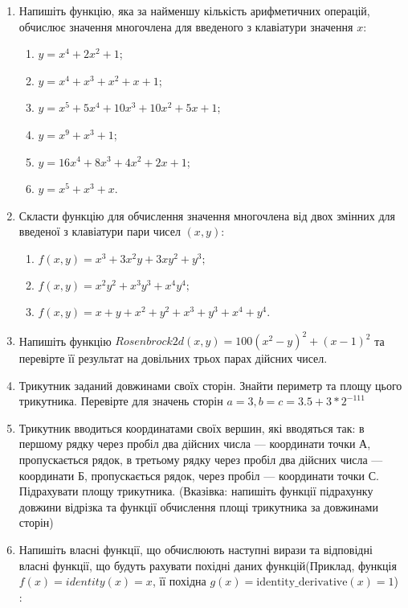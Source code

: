 \documentclass[]{article}
\makeatletter
\newcommand{\xslalph}[1]{\expandafter\@xslalph\csname c@#1\endcsname}
\newcommand{\@xslalph}[1]{%
    \ifcase#1\or а\or б\or в\or г\or д\or e\or є\or ж\or з\or i%
    \or й\or к\or л\or м\or н\or о\or п\or р\or с\or т%
    \or у\or ф\or х\or ц\or ч\or ш\or ю\or я\or аа\or бб\or вв %
    \else\@ctrerr\fi%
}
\makeatother
\begin{document}
\begin{enumerate}
\def\labelenumi{4.\arabic{enumi}.}
\item

 Напишіть функцію, яка за найменшу кількість арифметичних операцій,
  обчислює значення многочлена для введеного з клавіатури значення
  $x$:
  \begin{enumerate}[label=\xslalph*)]
  \item \(y = x^{4} + 2x^{2} + 1\); 
  \item \(y = x^{4} + x^{3} + x^{2} + x + 1\);
  \item \(y = x^{5} + 5x^{4} + 10x^{3} + 10x^{2} + 5x + 1\);
  \item \(y = x^{9} + x^{3} + 1\);
  \item \(y = 16x^{4} + 8x^{3} + 4x^{2} + 2x + 1\); 
  \item \(y = x^{5} + x^{3} + x\).
  \end{enumerate}
\item
 Скласти функцію для обчислення значення многочлена від двох змінних
  для введеної з клавіатури пари чисел \((x,y)\):
  \begin{enumerate}[label=\xslalph*)]
    \item
    \(f(x,y) = x^{3} + 3x^{2}y + 3xy^{2} + y^{3};\)
    \item
    \(f(x,y) = x^{2}y^{2} + x^{3}y^{3} + x^{4}y^{4};\)
    \item
    \(f(x,y) = x + y + x^{2} + y^{2} + x^{3} + y^{3} + x^{4} + y^{4}\).
  \end{enumerate}
\item
  Напишіть функцію $ Rosenbrock2d(x,y) = 100(x^{2} - y)^{2} + (x - 1)^{2}$ 
 та перевірте її результат на довільних трьох парах дійсних чисел.
\item
Трикутник заданий довжинами своїх сторін. Знайти периметр та площу цього
трикутника. Перевірте для значень сторін
\(a = 3,b = c = 3.5 + 3*2^{- 111}\)
\item
Трикутник вводиться координатами своїх вершин, які вводяться так: в
першому рядку через пробіл два дійсних числа --- координати точки А,
пропускається рядок, в третьому рядку через пробіл два дійсних числа ---
координати Б, пропускається рядок, через пробіл --- координати точки С.
Підрахувати площу трикутника. (Вказівка: напишіть функції підрахунку
довжини відрізка та функції обчислення площі трикутника за довжинами
сторін)
\item
  Напишіть власні функції, що обчислюють наступні вирази та відповідні
  власні функції, що будуть рахувати похідні даних функцій(Приклад,
  функція \(f(x) = identity(x) = x\), її похідна
  \(g(x) = \textrm{identity\_derivative}(x) = 1\)) :



\end{enumerate}
\end{document}
